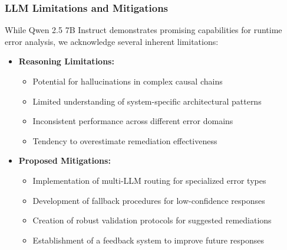 \subsubsection{LLM Limitations and Mitigations}
While Qwen 2.5 7B Instruct demonstrates promising capabilities for runtime error analysis, we acknowledge several inherent limitations:
\begin{itemize}
    \item \textbf{Reasoning Limitations:}
        \begin{itemize}
            \item Potential for hallucinations in complex causal chains
            \item Limited understanding of system-specific architectural patterns
            \item Inconsistent performance across different error domains
            \item Tendency to overestimate remediation effectiveness
        \end{itemize}
    \item \textbf{Proposed Mitigations:}
        \begin{itemize}
            \item Implementation of multi-LLM routing for specialized error types
            \item Development of fallback procedures for low-confidence responses
            \item Creation of robust validation protocols for suggested remediations
            \item Establishment of a feedback system to improve future responses
        \end{itemize}
\end{itemize}

